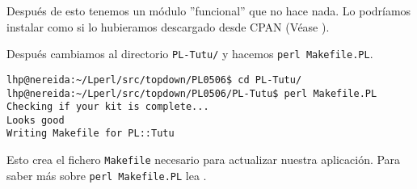 
Después de esto tenemos un módulo ''funcional'' que no hace nada.
Lo podríamos instalar como si lo hubieramos descargado desde CPAN
(Véase ).

Después cambiamos al directorio \verb|PL-Tutu/| y hacemos \verb|perl Makefile.PL|.
\begin{verbatim}
lhp@nereida:~/Lperl/src/topdown/PL0506$ cd PL-Tutu/
lhp@nereida:~/Lperl/src/topdown/PL0506/PL-Tutu$ perl Makefile.PL
Checking if your kit is complete...
Looks good
Writing Makefile for PL::Tutu
\end{verbatim}
Esto crea el fichero \verb|Makefile| necesario para actualizar 
nuestra aplicación. Para saber más sobre \verb|perl Makefile.PL|
lea .


